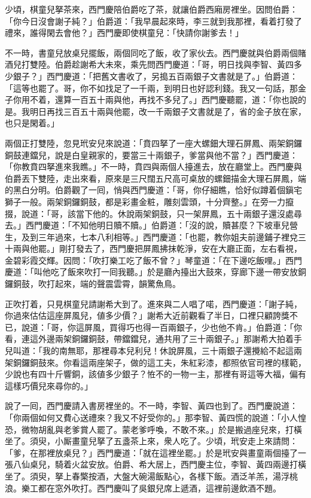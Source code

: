 少頃，棋童兒拏茶來，西門慶陪伯爵吃了茶，就讓伯爵西廂房裡坐。因問伯爵：「你今日沒會謝子純？」伯爵道：「我早晨起來時，李三就到我那裡，看着打發了禮來，誰得閑去會他？」西門慶即使棋童兒：「快請你謝爹去！」

不一時，書童兒放桌兒擺飯，兩個同吃了飯，收了家伙去。西門慶就與伯爵兩個賭酒兒打雙陸。伯爵趁謝希大未來，乘先問西門慶道：「哥，明日找與李智、黃四多少銀子？」西門慶道：「把舊文書收了，另搗五百兩銀子文書就是了。」伯爵道：「這等也罷了。哥，你不如找足了一千兩，到明日也好認利錢。我又一句話，那金子你用不着，還算一百五十兩與他，再找不多兒了。」西門慶聽罷，道：「你也說的是。我明日再找三百五十兩與他罷，改一千兩銀子文書就是了，省的金子放在家，也只是閑着。」

兩個正打雙陸，忽見玳安兒來說道：「賁四拏了一座大螺鈿大理石屏鳳、兩架銅鑼銅鼓連鐺兒，說是白皇親家的，要當三十兩銀子，爹當與他不當？」西門慶道：「你教賁四拏進來我瞧。」不一時，賁四與兩個人擡進去，放在廳堂上。西門慶與伯爵丟下雙陸，走出來看，原來是三尺闊五尺高可桌放的螺鈿描金大理石屏鳳，端的黑白分明。伯爵觀了一囘，悄與西門慶道：「哥，你仔細瞧，恰好似蹲着個鎭宅獅子一般。兩架銅鑼銅鼓，都是彩畫金粧，雕刻雲頭，十分齊整。」在旁一力攛掇，說道：「哥，該當下他的。休說兩架銅鼓，只一架屏鳳，五十兩銀子還沒處尋去。」西門慶道：「不知他明日贖不贖。」伯爵道：「沒的說，贖甚麼？下坡車兒營生，及到三年過來，七本八利相等。」西門慶道：「也罷，教你姐夫前邊鋪子裡兌三十兩與他罷。」剛打發去了，西門慶把屏鳳拂抹乾淨，安在大廳正面，左右看視，金碧彩霞交輝。因問：「吹打樂工吃了飯不曾？」琴童道：「在下邊吃飯哩。」西門慶道：「叫他吃了飯來吹打一囘我聽。」於是廳內擡出大鼓來，穿廊下邊一帶安放銅鑼銅鼓，吹打起來，端的聲震雲霄，韻驚魚鳥。

正吹打着，只見棋童兒請謝希大到了。進來與二人唱了喏，西門慶道：「謝子純，你過來估估這座屏風兒，値多少價？」謝希大近前觀看了半日，口裡只顧誇獎不已，說道：「哥，你這屏風，買得巧也得一百兩銀子，少也他不肯。」伯爵道：「你看，連這外邊兩架銅鑼銅鼓，帶鐺鐺兒，通共用了三十兩銀子。」那謝希大拍着手兒叫道：{}「我的南無耶，那裡尋本兒利兒！休說屏風，三十兩銀子還攪給不起這兩架銅鑼銅鼓來。你看這兩座架子，做的這工夫，朱紅彩漆，都照依官司裡的樣範，少說也有四十斤響銅，該値多少銀子？恠不的一物一主，那裡有哥這等大福，偏有這樣巧價兒來尋你的。」

說了一囘，西門慶請入書房裡坐的。不一時，李智、黃四也到了。西門慶說道：「你兩個如何又費心送禮來？我又不好受你的。」那李智、黃四慌的說道：「小人惶恐，微物胡亂與老爹賞人罷了。蒙老爹呼喚，不敢不來。」於是搬過座兒來，打橫坐了。須臾，小厮畫童兒拏了五盞茶上來，衆人吃了。少頃，玳安走上來請問：「爹，在那裡放桌兒？」西門慶道：「就在這裡坐罷。」於是玳安與畫童兩個擡了一張八仙桌兒，騎着火盆安放。伯爵、希大居上，西門慶主位，李智、黃四兩邊打橫坐了。須臾，拏上春檠按酒，大盤大碗湯飯點心，各樣下飯。酒泛羊羔，湯浮桃浪。樂工都在窓外吹打。西門慶叫了吳銀兒席上遞酒，這裡前邊飲酒不題。

